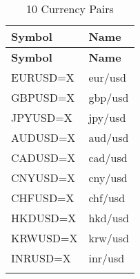 \begin{longtable}{|l|l|}
\hline
\textbf{Symbol} & \textbf{Name}  \\ \midrule
\endfirsthead

\hline
\textbf{Symbol} & \textbf{Name} \\ \midrule
\endhead

\endfoot

\hline
EURUSD=X & \acrfull{eur}/\acrshort{usd} \\ \hline
GBPUSD=X & \acrfull{gbp}/\acrshort{usd} \\ \hline
JPYUSD=X & \acrfull{jpy}/\acrshort{usd} \\ \hline
AUDUSD=X & \acrfull{aud}/\acrshort{usd} \\ \hline
CADUSD=X & \acrfull{cad}/\acrshort{usd} \\ \hline
CNYUSD=X & \acrfull{cny}/\acrshort{usd} \\ \hline
CHFUSD=X & \acrfull{chf}/\acrshort{usd} \\ \hline
HKDUSD=X & \acrfull{hkd}/\acrshort{usd} \\ \hline
KRWUSD=X & \acrfull{krw}/\acrshort{usd} \\ \hline
INRUSD=X & \acrfull{inr}/\acrshort{usd} \\ \hline
\caption{10 Currency Pairs}
\label{tab:currencies}
\end{longtable}
